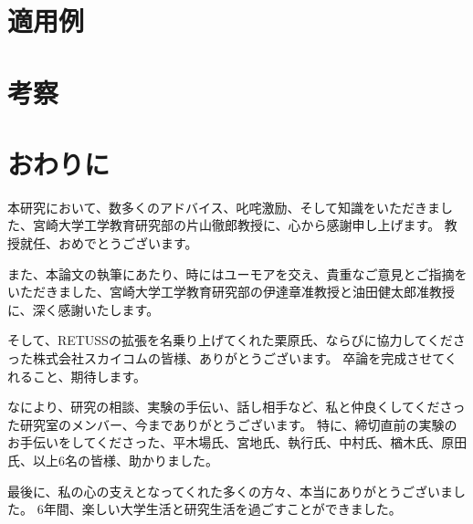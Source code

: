 \documentclass[uplatex, report, a4j, 10pt]{jsbook}
\newcommand{\tool}{RETUSS}
\begin{document}
\chapter{適用例}\label{cha:Indication}

\chapter{考察}\label{cha:Evaluation}

\chapter{おわりに} \label{cha:Conclusion}

%
\acknowledgment{}

本研究において、数多くのアドバイス、叱咤激励、そして知識をいただきました、宮崎大学工学教育研究部の片山徹郎教授に、心から感謝申し上げます。
教授就任、おめでとうございます。

また、本論文の執筆にあたり、時にはユーモアを交え、貴重なご意見とご指摘をいただきました、宮崎大学工学教育研究部の伊達章准教授と油田健太郎准教授に、深く感謝いたします。

そして、\tool{}の拡張を名乗り上げてくれた栗原氏、ならびに協力してくださった株式会社スカイコムの皆様、ありがとうございます。
卒論を完成させてくれること、期待します。

なにより、研究の相談、実験の手伝い、話し相手など、私と仲良くしてくださった研究室のメンバー、今までありがとうございます。
特に、締切直前の実験のお手伝いをしてくださった、平木場氏、宮地氏、執行氏、中村氏、楢木氏、原田氏、以上6名の皆様、助かりました。

最後に、私の心の支えとなってくれた多くの方々、本当にありがとうございました。
6年間、楽しい大学生活と研究生活を過ごすことができました。
\end{document}
